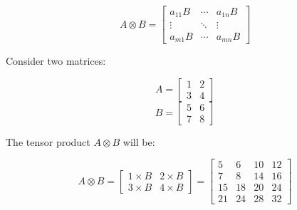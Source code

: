 \documentclass[12pt, a4paper]{article}
\begin{document}
\[ A \otimes B = \begin{bmatrix} a_{11}B & \cdots & a_{1n}B \\ \vdots & \ddots & \vdots \\ a_{m1}B & \cdots & a_{mn}B \end{bmatrix} \]

\begin{mdexample}
    Consider two matrices:

\[ A = \begin{bmatrix} 1 & 2 \\ 3 & 4 \end{bmatrix} \]
\[ B = \begin{bmatrix} 5 & 6 \\ 7 & 8 \end{bmatrix} \]

The tensor product \( A \otimes B \) will be:

\[ A \otimes B = \begin{bmatrix} 1 \times B & 2 \times B \\ 3 \times B & 4 \times B \end{bmatrix} = \begin{bmatrix} 5 & 6 & 10 & 12 \\ 7 & 8 & 14 & 16 \\ 15 & 18 & 20 & 24 \\ 21 & 24 & 28 & 32 \end{bmatrix} \]

\end{mdexample}
\end{document}
